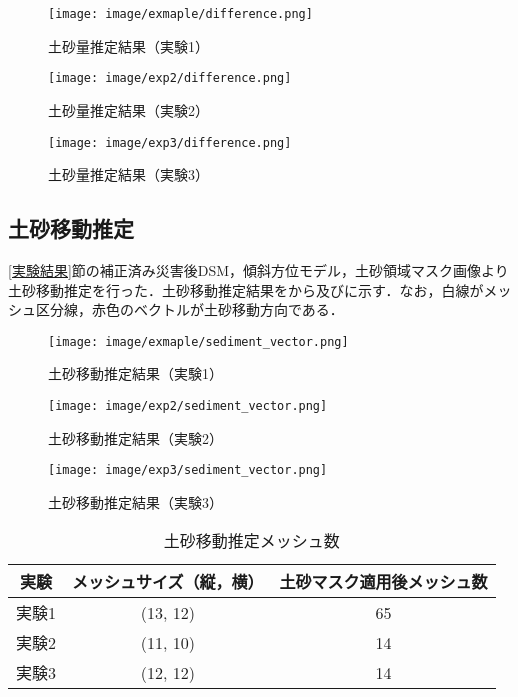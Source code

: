       \begin{figure}[tbp]
        \centering
        \texttt{[image: image/exmaple/difference.png]}
        \caption{土砂量推定結果（実験1）}
        \label{土砂量推定結果（実験1）}
      \end{figure}

      \begin{figure}[tbp]
        \centering
        \texttt{[image: image/exp2/difference.png]}
        \caption{土砂量推定結果（実験2）}
      \end{figure}

      \begin{figure}[tbp]
        \centering
        \texttt{[image: image/exp3/difference.png]}
        \caption{土砂量推定結果（実験3）}
        \label{土砂量推定結果（実験3）}
      \end{figure}


    \subsection*{土砂移動推定}
      \ref{実験結果}節の補正済み災害後DSM，傾斜方位モデル，土砂領域マスク画像より土砂移動推定を行った．土砂移動推定結果をから及びに示す．なお，白線がメッシュ区分線，赤色のベクトルが土砂移動方向である．

      \begin{figure}[tbp]
        \centering
        \texttt{[image: image/exmaple/sediment\_vector.png]}
        \caption{土砂移動推定結果（実験1）}
        \label{土砂移動推定結果（実験1）}
      \end{figure}

      \begin{figure}[tbp]
        \centering
        \texttt{[image: image/exp2/sediment\_vector.png]}
        \caption{土砂移動推定結果（実験2）}
      \end{figure}

      \begin{figure}[tbp]
        \centering
        \texttt{[image: image/exp3/sediment\_vector.png]}
        \caption{土砂移動推定結果（実験3）}
        \label{土砂移動推定結果（実験3）}
      \end{figure}

      \begin{table}[tbp]
        \centering
        \caption{土砂移動推定メッシュ数}
        \label{土砂移動推定メッシュ数}
        \begin{tabular}{ccc}
          \hline
          \textbf{実験} & \textbf{メッシュサイズ（縦，横）} & \textbf{土砂マスク適用後メッシュ数} \\
          \hline  \hline
          実験1 & (13, 12) & 65 \\
          実験2 & (11, 10) & 14 \\
          実験3 & (12, 12) & 14 \\ \hline
        \end{tabular}
      \end{table}
 

